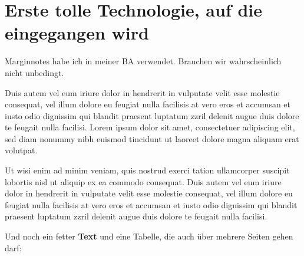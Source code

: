 \section{Erste tolle Technologie, auf die eingegangen wird}
\label{sec:Erste Technologie}

 Marginnotes habe ich in meiner BA verwendet. Brauchen wir wahrscheinlich nicht unbedingt.

Duis autem vel eum iriure dolor in hendrerit in vulputate velit esse molestie consequat, vel illum dolore eu feugiat nulla facilisis at vero eros et accumsan et iusto odio dignissim qui blandit praesent luptatum zzril delenit augue duis dolore te feugait nulla facilisi. Lorem ipsum dolor sit amet, consectetuer adipiscing elit, sed diam nonummy nibh euismod tincidunt ut laoreet dolore magna aliquam erat volutpat.

Ut wisi enim ad minim veniam, quis nostrud exerci tation ullamcorper suscipit lobortis nisl ut aliquip ex ea commodo consequat. Duis autem vel eum iriure dolor in hendrerit in vulputate velit esse molestie consequat, vel illum dolore eu feugiat nulla facilisis at vero eros et accumsan et iusto odio dignissim qui blandit praesent luptatum zzril delenit augue duis dolore te feugait nulla facilisi.

Und noch ein fetter \textbf{Text} und eine Tabelle, die auch über mehrere Seiten gehen darf:

